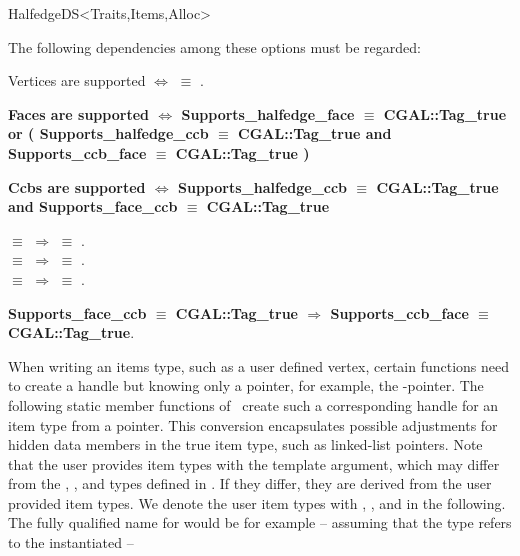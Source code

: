 \begin{ccRefConcept}{HalfedgeDS<Traits,Items,Alloc>}
\begin{ccAdvanced}
The following dependencies among these options must be regarded:

Vertices are supported $\Longleftrightarrow$
 $\equiv$ .

\textbf{Faces are supported $\Longleftrightarrow$
Supports\_halfedge\_face $\equiv$ CGAL::Tag\_true
or
( Supports\_halfedge\_ccb $\equiv$ CGAL::Tag\_true
and Supports\_ccb\_face $\equiv$ CGAL::Tag\_true )
}

\textbf{Ccbs are supported $\Longleftrightarrow$
Supports\_halfedge\_ccb $\equiv$ 
CGAL::Tag\_true
and
Supports\_face\_ccb
$\equiv$ CGAL::Tag\_true
}

 $\equiv$  $\Longrightarrow$
 $\equiv$ .
\\
 $\equiv$  $\Longrightarrow$
 $\equiv$ .
\\
 $\equiv$  $\Longrightarrow$
 $\equiv$ .

\textbf{Supports\_face\_ccb $\equiv$ CGAL::Tag\_true $\Longrightarrow$
Supports\_ccb\_face $\equiv$ CGAL::Tag\_true}.


\end{ccAdvanced}

\begin{ccAdvanced}

When writing an items type, such as a user defined vertex, certain
functions need to create a handle but knowing only a pointer, for
example, the -pointer. The following static member functions
of \ccRefName\ create such a corresponding handle for an item type
from a pointer. This conversion encapsulates possible adjustments for
hidden data members in the true item type, such as linked-list
pointers. Note that the user provides item types with the
 template argument, which may differ from the ,
, and  types defined in \ccRefName. If they 
differ, they are derived from the user provided item types. We denote the
user item types with , , and
 in the following. The fully qualified name for 
 would be for example -- assuming that the type 
refers to the instantiated  --


\end{ccAdvanced}
\end{ccRefConcept}

